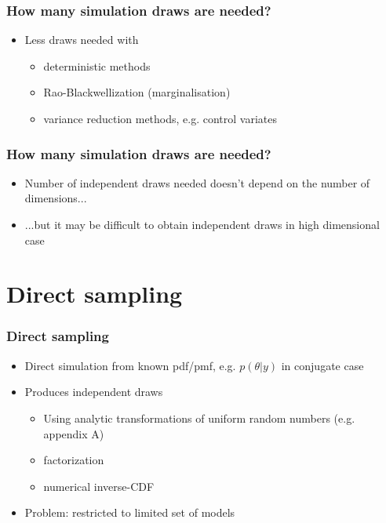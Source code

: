 \documentclass[10pt]{beamer}
\begin{document}
\begin{frame}

\frametitle{How many simulation draws are needed?}

  \begin{itemize}
  \item Less draws needed with
    \begin{itemize}
    \item deterministic methods
    \item Rao-Blackwellization (marginalisation)
    \item variance reduction methods, e.g. control variates
    \end{itemize}
  \end{itemize}

\end{frame}

\begin{frame}

\frametitle{How many simulation draws are needed?}

  \begin{itemize}
  \item Number of independent draws needed doesn't depend on the number of dimensions...
\pause
    \item ...but it may be difficult to obtain independent draws in high dimensional case

  \end{itemize}

\end{frame}


\section{Direct sampling}
\frame{\sectionpage}

\begin{frame}
\frametitle{Direct sampling}

  \begin{itemize}
  \item Direct simulation from known pdf/pmf, e.g. $p(\theta|y)$ in conjugate case
  \item Produces independent draws
    \begin{itemize}
    \item Using analytic transformations of uniform random numbers
      (e.g. appendix A)
    \item factorization
    \item numerical inverse-CDF
    \end{itemize}
  \item {\color{uured} Problem}: restricted to limited set of models
  \end{itemize}

\end{frame}
\end{document}
